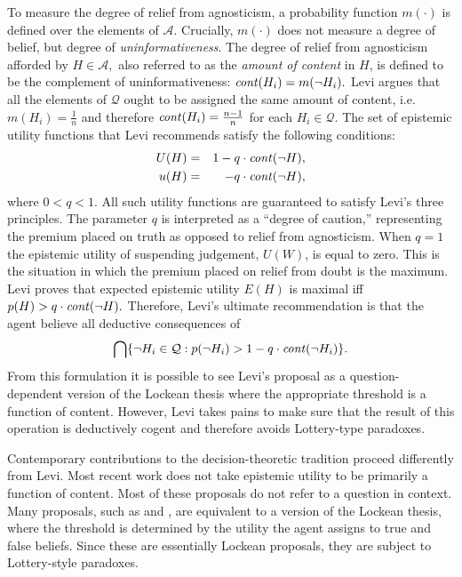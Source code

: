 To measure the degree of relief from agnosticism, a probability function
$m(\cdot)$ is defined over the elements of $\mathcal{A}$. Crucially, $m(\cdot)$
does not measure a degree of belief, but degree of {\em uninformativeness}.  The
degree of relief from agnosticism afforded by $H\in \mathcal{A},$ also referred
to as the {\em amount of content} in $H$,  is defined to be the complement of
uninformativeness: $\text{\textit{cont}}(H_i) = m(\neg H_i).$  Levi argues that
all the elements of $\mathcal{Q}$ ought to be assigned the same amount of
content, i.e. $m(H_i)=\frac{1}{n}$ and therefore $\text{\textit{cont}}(H_i)=
\frac{n-1}{n}$  for each $H_i\in\mathcal{Q}$. The set of epistemic utility
functions that Levi recommends satisfy the following conditions:
$$
 \begin{aligned}
    U(H) &=& 1 - q\cdot \text{\textit{cont}}(\neg H),\\
    u(H) &=& \hspace{7pt} - q\cdot \text{\textit{cont}}(\neg H),
  \end{aligned}
$$
where $0<q<1.$ All such utility functions are guaranteed to satisfy Levi's three
principles. The parameter $q$ is interpreted as a ``degree of caution,''
representing the premium  placed on truth as opposed to relief from agnosticism.
When $q=1$ the epistemic utility of suspending judgement, $U(W)$, is equal to
zero. This is the situation in which the premium placed on relief from doubt is
the maximum. Levi proves that expected epistemic utility $E(H)$ is maximal iff
$p(H)> q \cdot \text{\textit{cont}}(\neg H).$ Therefore, Levi's ultimate
recommendation is that the agent believe all deductive consequences of $$\bigcap
\{ \neg H_i \in \mathcal{Q} : p(\neg H_i)> 1 - q \cdot \text{\textit{cont}}(\neg
H_i) \}.$$ From this formulation  it is possible to see Levi's proposal as a
question-dependent version of the Lockean thesis where the appropriate threshold
is a function of content. However, Levi takes pains to make sure that the result
of this operation is deductively cogent and therefore  avoids Lottery-type
paradoxes.

Contemporary contributions to the decision-theoretic tradition proceed
differently from Levi. Most recent work does not take epistemic utility to be
primarily a function of content. Most of these proposals do not refer to a
question in context.  Many proposals, such as \citet{easwaran2015truthlove} and
\citet{dorst2017lockeans}, are equivalent to a version of the Lockean thesis,
where the threshold is determined by the utility the agent assigns to true and
false beliefs. Since these are essentially Lockean proposals, they are subject
to Lottery-style paradoxes.